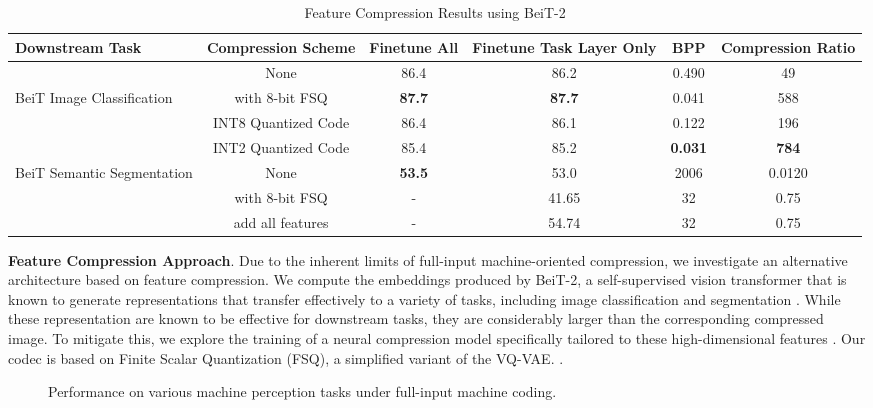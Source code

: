 \documentclass[10pt,twocolumn,letterpaper]{article}
\begin{document}
\begin{table*}
\centering
\caption{Feature Compression Results using BeiT-2}
\label{tab:feature_compression_results}
\begin{tabular}{lccccc}
\toprule
Downstream Task & Compression Scheme & Finetune All & Finetune Task Layer Only & BPP & Compression Ratio \\
\midrule
\cmidrule(lr){1-5}
& None & 86.4 & 86.2 & 0.490 & 49 \\
BeiT Image Classification  & with 8-bit FSQ & \textbf{87.7} & \textbf{87.7} & 0.041 & 588 \\
&INT8 Quantized Code & 86.4 & 86.1 & 0.122 & 196 \\
&INT2 Quantized Code & 85.4 & 85.2 & \textbf{0.031} & \textbf{784} \\
\midrule
\cmidrule(lr){1-5}
BeiT Semantic Segmentation & None & \textbf{53.5} & 53.0 & 2006 & 0.0120 \\
 & with 8-bit FSQ & - & 41.65 & 32 & 0.75 \\
  & add all features & - & 54.74 & 32 & 0.75 \\
\bottomrule
\end{tabular}
\end{table*}

\textbf{Feature Compression Approach}.
Due to the inherent limits of full-input machine-oriented compression, we investigate an alternative architecture based on feature compression. We compute the embeddings produced by BeiT-2, a self-supervised vision transformer that is known to generate representations that transfer effectively to a variety of tasks, including image classification and segmentation \cite{peng2022beit}. While these representation are known to be effective for downstream tasks, they are considerably larger than the corresponding compressed image. To mitigate this, we explore the training of a neural compression model specifically tailored to these high-dimensional features \cite{singh2020end}. Our codec is based on Finite Scalar Quantization (FSQ), a simplified variant of the VQ-VAE. \cite{mentzer2023finite}.

\begin{figure*}
\begin{center}
\end{center}
\caption{\label{fig:example}%
Performance on various machine perception tasks under full-input machine coding.}
\end{figure*}
\end{document}
